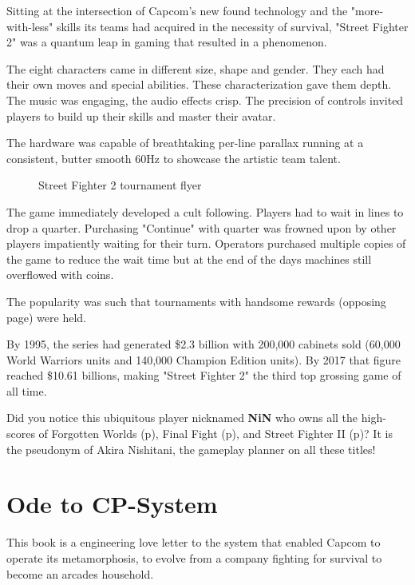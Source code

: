 Sitting at the intersection of Capcom's new found technology and the "more-with-less" skills its teams had acquired in the necessity of survival, "Street Fighter 2" was a quantum leap in gaming that resulted in a phenomenon.  

The eight characters came in different size, shape and gender. They each had their own moves and special abilities. These characterization gave them depth. The music was engaging, the audio effects crisp. The precision of controls invited players to build up their skills and master their avatar. 

The hardware was capable of breathtaking per-line parallax running at a consistent, butter smooth 60Hz to showcase the artistic team talent. 


\begin{figure}[H]
\caption*{Street Fighter 2 tournament flyer}
\end{figure}

The game immediately developed a cult following. Players had to wait in lines to drop a quarter. Purchasing "Continue" with quarter was frowned upon by other players impatiently waiting for their turn. Operators purchased multiple copies of the game to reduce the wait time but at the end of the days machines still overflowed with coins\cite{sf2_oral_history}.

The popularity was such that tournaments with handsome rewards (opposing page) were held. 

By 1995, the series had generated \$2.3 billion with 200,000 cabinets sold\cite{usgamer20160101} (60,000 World Warriors units and 140,000 Champion Edition units). By 2017 that figure reached \$10.61 billions\cite{gamerevolution20140126}, making "Street Fighter 2" the third top grossing game of all time.

\begin{trivia}
Did you notice this ubiquitous player nicknamed \textbf{NiN} who owns all the high-scores of Forgotten Worlds (p\pageref{nin_fw}), Final Fight (p\pageref{nin_ff}), and Street Fighter II (p\pageref{nin_sf2})? It is the pseudonym of Akira Nishitani, the gameplay planner on all these titles!
\end{trivia}

\section{Ode to CP-System}

This book is a engineering love letter to the system that enabled Capcom to operate its metamorphosis, to evolve from a company fighting for survival to become an arcades household.

